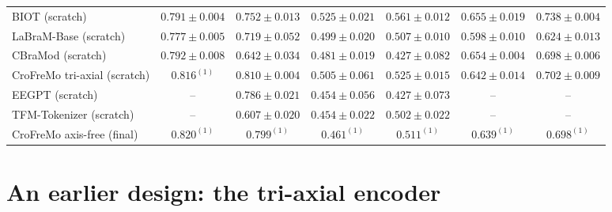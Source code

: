 \begin{table}[h]
\begin{tabular}{lcccccc}
BIOT (scratch) & $0.791 \pm 0.004$ & $0.752 \pm 0.013$ & $0.525 \pm 0.021$ & $0.561 \pm 0.012$ & $0.655 \pm 0.019$ & $0.738 \pm 0.004$ \\
LaBraM-Base (scratch) & $0.777 \pm 0.005$ & $0.719 \pm 0.052$ & $0.499 \pm 0.020$ & $0.507 \pm 0.010$ & $0.598 \pm 0.010$ & $0.624 \pm 0.013$ \\
CBraMod (scratch) & $0.792 \pm 0.008$ & $0.642 \pm 0.034$ & $0.481 \pm 0.019$ & $0.427 \pm 0.082$ & $0.654 \pm 0.004$ & $0.698 \pm 0.006$ \\
CroFreMo tri-axial (scratch) & $0.816^{(1)}$ & $0.810 \pm 0.004$ & $0.505 \pm 0.061$ & $0.525 \pm 0.015$ & $0.642 \pm 0.014$ & $0.702 \pm 0.009$ \\
EEGPT (scratch) & -- & $0.786 \pm 0.021$ & $0.454 \pm 0.056$ & $0.427 \pm 0.073$ & -- & -- \\
TFM-Tokenizer (scratch) & -- & $0.607 \pm 0.020$ & $0.454 \pm 0.022$ & $0.502 \pm 0.022$ & -- & -- \\
CroFreMo axis-free (final) & $0.820^{(1)}$ & $0.799^{(1)}$ & $0.461^{(1)}$ & $0.511^{(1)}$ & $0.639^{(1)}$ & $0.698^{(1)}$ \\
\bottomrule
\end{tabular}
\end{table}

\section{An earlier design: the tri-axial encoder}
\label{app:triaxial}
\label{app:triaxial-coupling}

